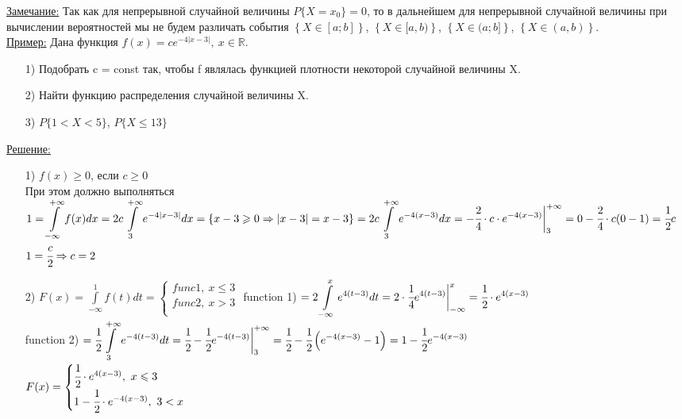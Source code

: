\underline{Замечание:} Так как для непрерывной случайной величины $P\{X = x_0\} = 0$, то в дальнейшем для непрерывной случайной величины при вычислении вероятностей мы не будем различать события $\left\{ X \in [a;b] \right\}$, $\left\{ X \in [a,b) \right\}$, $\left\{ X \in (a;b] \right\}$, $\left\{ X \in (a,b) \right\}$. \\


\underline{Пример:} Дана функция $f(x) = ce^{-4|x-3|}, \ x \in \mathbb{R}$. 
\begin{enumerate}
\item[1)] Подобрать c = const так, чтобы f являлась функцией плотности некоторой случайной величины X.
\item[2)] Найти функцию распределения случайной величины X.
\item[3)] $P\{1 < X < 5\}$,  $P\{X \leqslant 13\}$
\end{enumerate}
\underline{Решение:}
\begin{enumerate}
\item[1)] $f(x) \geqslant 0$, если $c \geqslant 0$ \\
При этом должно выполняться $\displaystyle  1 = \int\limits_{-\infty}^{+\infty} f(x) dx = 2c \int\limits_{3}^{+\infty} e^{-4|x-3|} dx = \left\{x - 3 \geqslant 0 \Rightarrow |x-3| = x - 3\right\} = 2c \int\limits_{3}^{+\infty} e^{-4(x-3)} dx = - \cfrac{2}{4} \cdot c \cdot e^{-4(x-3)} \bigg|_{3}^{+\infty} = 0 - \cfrac{2}{4} \cdot c (0 - 1) = \cfrac{1}{2} c$ \\
$1 = \cfrac{c}{2} \Rightarrow c = 2$ \\

\item[2)]  %
$\displaystyle  F(x) = \int\limits_{-\infty}^{1} f(t) dt = 
\begin{cases}
	func 1, \ x \leqslant 3 \\
	func 2, \ x > 3 \\
\end{cases}$
function 1) $\displaystyle  = 2 \int\limits_{-\infty}^{x} e^{4(t-3)} dt = 2 \cdot \cfrac{1}{4} e^{4(t-3)} \bigg|_{-\infty}^{x} = \cfrac{1}{2} \cdot e^{4(x-3)}$ \\
function 2) $\displaystyle  = \cfrac{1}{2} \int\limits_{3}^{+\infty} e^{-4(t-3)} dt = \cfrac{1}{2} - \cfrac{1}{2} e^{-4(t-3)} \bigg|_{3}^{+\infty} = \cfrac{1}{2} - \cfrac{1}{2} \left(e^{-4(x-3)} - 1 \right) = 1 - \cfrac{1}{2} e^{-4(x-3)}$ \\

$F(x) = 
\begin{cases}
	\cfrac12 \cdot e^{4(x-3)}, \ x \leqslant 3 \\
	1 - \cfrac12 \cdot e^{-4(x-3)}, \ 3 < x \\
\end{cases}$
\end{enumerate}
































